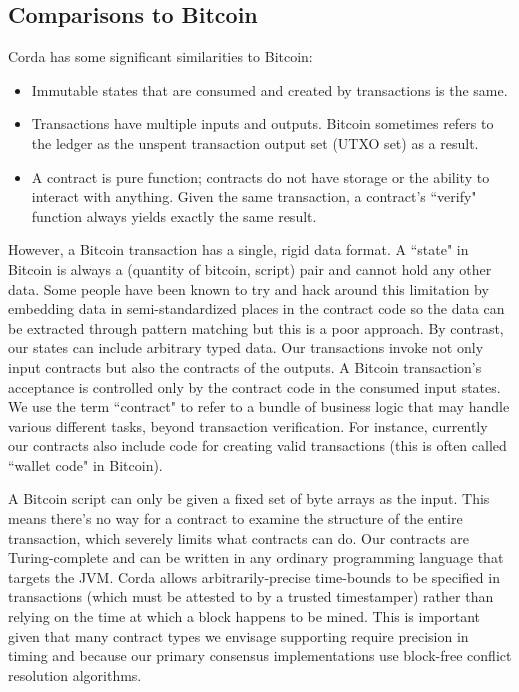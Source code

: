\documentclass{article}
\begin{document}
\subsection{Comparisons to Bitcoin}
Corda has some significant similarities to Bitcoin: 
\begin{itemize}
\item{Immutable states that are consumed and created by transactions is the same.}
\item{Transactions have multiple inputs and outputs. Bitcoin sometimes refers to the ledger as the unspent transaction output set (UTXO set) as a result.}
\item{A contract is pure function; contracts do not have storage or the ability to interact with anything. Given the same transaction, a contract's ``verify" function always yields exactly the same result.}
\end{itemize}

However, a Bitcoin transaction has a single, rigid data format. A ``state" in Bitcoin is always a (quantity of bitcoin, script) pair and cannot hold any other data. Some people have been known to try and hack around this limitation by embedding data in semi-standardized places in the contract code so the data can be extracted through pattern matching but this is a poor approach. By contrast, our states can include arbitrary typed data. Our transactions invoke not only input contracts but also the contracts of the outputs. A Bitcoin transaction's acceptance is controlled only by the contract code in the consumed input states. We use the term ``contract" to refer to a bundle of business logic that may handle various different tasks, beyond transaction verification. For instance, currently our contracts also include code for creating valid transactions (this is often called ``wallet code" in Bitcoin).

A Bitcoin script can only be given a fixed set of byte arrays as the input. This means there's no way for a contract to examine the structure of the entire transaction, which severely limits what contracts can do. Our contracts are Turing-complete and can be written in any ordinary programming language that targets the JVM.	
Corda allows arbitrarily-precise time-bounds to be specified in transactions (which must be attested to by a trusted timestamper) rather than relying on the time at which a block happens to be mined.  This is important given that many contract types we envisage supporting require precision in timing and because our primary consensus implementations use block-free conflict resolution algorithms.
\end{document}
